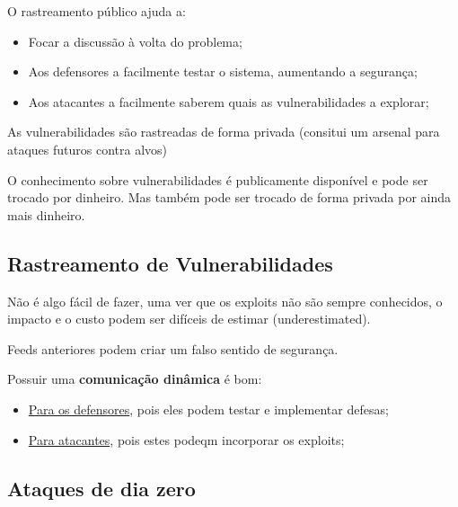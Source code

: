 \documentclass{article}
\begin{document}
  \vspace{2mm}

  O rastreamento público ajuda a:
  \begin{itemize}
    \item Focar a discussão à volta do problema;
    \item Aos defensores a facilmente testar o sistema, aumentando a segurança;
    \item Aos atacantes a facilmente saberem quais as vulnerabilidades a explorar;
  \end{itemize}

  \vspace{2mm}

  As vulnerabilidades são rastreadas de forma privada (consitui um arsenal para
  ataques futuros contra alvos)

  \vspace{2mm}

  O conhecimento sobre vulnerabilidades é publicamente disponível e pode
  ser trocado por dinheiro. Mas também pode ser trocado de forma privada
  por ainda mais dinheiro.


  \subsection{Rastreamento de Vulnerabilidades}

  Não é algo fácil de fazer, uma ver que os exploits não são sempre
  conhecidos, o impacto e o custo podem ser difíceis de estimar (underestimated).

  \vspace{2mm}

  Feeds anteriores podem criar um falso sentido de segurança.

  \vspace{2mm}

  Possuir uma \textbf{comunicação dinâmica} é bom:
  \begin{itemize}
    \item \uline{Para os defensores}, pois eles podem testar e implementar defesas;
    \item \uline{Para atacantes}, pois estes podeqm incorporar os exploits;
  \end{itemize}

  \pagebreak

  \subsection{Ataques de dia zero}
\end{document}
